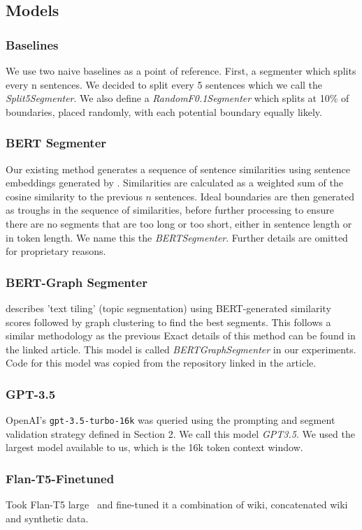 \subsection{Models}

\subsubsection{Baselines}

We use two naive baselines as a point of reference. First, a segmenter which splits every n sentences. We decided to split every 5 sentences which we call the \emph{Split5Segmenter}. We also define a \emph{RandomF0.1Segmenter} which splits at 10\% of boundaries, placed randomly, with each potential boundary equally likely.

\subsubsection{BERT Segmenter}

Our existing method generates a sequence of sentence similarities using sentence embeddings generated by \cite{SentenceBERT}. Similarities are calculated as a weighted sum of the cosine similarity to the previous $n$ sentences. Ideal boundaries are then generated as troughs in the sequence of similarities, before further processing to ensure there are no segments that are too long or too short, either in sentence length or in token length. We name this the \emph{BERTSegmenter}. Further details are omitted for proprietary reasons.

\subsubsection{BERT-Graph Segmenter}

\cite{MasimilianoSegmenter} describes 'text tiling' (topic segmentation) using BERT-generated similarity scores followed by graph clustering to find the best segments. This follows a similar methodology as the previous Exact details of this method can be found in the linked article. This model is called \emph{BERTGraphSegmenter} in our experiments. Code for this model was copied from the repository linked in the article.

\subsubsection{GPT-3.5}

OpenAI's \texttt{gpt-3.5-turbo-16k} was queried using the prompting and segment validation strategy defined in Section 2. We call this model \emph{GPT3.5}. We used the largest model available to us, which is the 16k token context window.

\subsubsection{Flan-T5-Finetuned}\label{FlanT5}

Took Flan-T5 large~\citep{FlanT5} and fine-tuned it a combination of wiki, concatenated wiki and synthetic data.